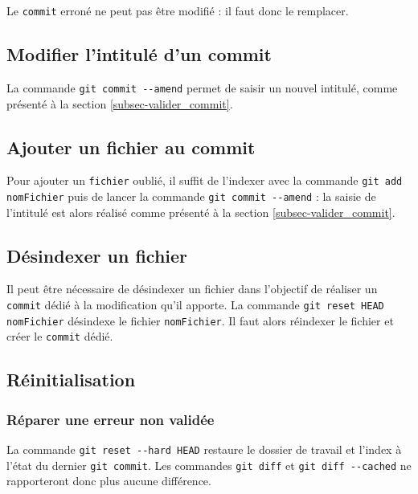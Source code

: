 \documentclass[11pt,twoside,headings=normal,open=right,french,DIV=12]{scrreprt}
\newcommand{\spec}[1]{\texttt{#1}}
\newcommand{\img}[2]{\texttt{[image: \#2]}}
\newcommand{\info}[1]{
    \begin{minipage}{\textwidth}
	    \begin{minipage}[c]{0.1\linewidth}
		    \centering\img{0.1}{../images/info}
        \end{minipage}    
		\begin{minipage}[c]{0.8\linewidth}
		    #1
        \end{minipage}
    \end{minipage}
	}
\begin{document}
Le \verb|commit| erroné ne peut pas être modifié : il faut donc le remplacer.


\subsection{Modifier l'intitulé d'un commit}



La commande \verb|git commit --amend| permet de saisir un nouvel intitulé, comme présenté à la section \ref{subsec-valider_commit}.



\subsection{Ajouter un fichier au commit}


    
    Pour ajouter un \spec{fichier} oublié, il suffit de l'indexer avec la commande \verb|git add nomFichier| puis de lancer la commande \verb|git commit --amend| : la saisie de l'intitulé est alors  réalisé comme présenté à la section \ref{subsec-valider_commit}.



\subsection{Désindexer un fichier}



    Il peut être nécessaire de désindexer un fichier dans l'objectif de réaliser un \spec{commit} dédié à la modification qu'il apporte. La commande \verb|git reset HEAD nomFichier| désindexe le fichier \spec{nomFichier}. Il faut alors réindexer le fichier et créer le \spec{commit} dédié.



\subsection{Réinitialisation}



\subsubsection{Réparer une erreur non validée}




La commande \verb|git reset --hard HEAD| restaure le dossier de travail et l'index à l'état du dernier \verb|git commit|. Les commandes \verb|git diff| et \verb|git diff --cached| ne rapporteront donc plus aucune différence.
\end{document}

